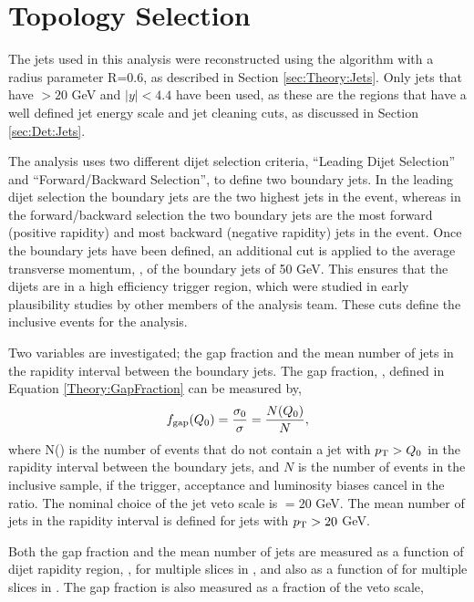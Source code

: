 \section{Topology Selection}
\label{sec:GBJ1:AnalSel}

The jets used in this analysis were reconstructed using the \antikt{} algorithm with a radius parameter R=0.6, as described in Section \ref{sec:Theory:Jets}.
Only jets that have \pt{}$>20$ GeV and $|y|<4.4$ have been used, as these are the regions that have a well defined jet energy scale and jet cleaning cuts, as discussed in Section \ref{sec:Det:Jets}. 

The analysis uses two different dijet selection criteria, ``Leading \pt{} Dijet Selection'' and ``Forward/Backward Selection'', to define two boundary jets. 
In the leading dijet \pt{} selection the boundary jets are the two highest \pt{} jets in the event, whereas in the forward/backward selection the two boundary jets are the most forward (positive rapidity) and most backward (negative rapidity) jets in the event. 
Once the boundary jets have been defined, an additional cut is applied to the average transverse momentum, \ptb{}, of the boundary jets of 50 GeV. 
This ensures that the dijets are in a high efficiency trigger region, which were studied in early plausibility studies \cite{ref:GBJConf1} by other members of the analysis team. 
These cuts define the inclusive events for the analysis. 


Two variables are investigated; the gap fraction and the mean  number of jets in the rapidity interval between the boundary jets. 
The gap fraction, \gap, defined in Equation \ref{Theory:GapFraction} can be measured by,
\begin{equation}
f_{\rm gap}(\mbox{$Q_0$}{}) = \frac{\sigma_{0}}{\sigma} =  \frac{N (\mbox{$Q_0$}{})}{N},
\label{GBJ1:fgap}
\end{equation}
where N(\qz{}) is the number of events that do not contain a jet with $\mbox{$p_{\rm T}$}{}>\mbox{$Q_0$}{}$ in the rapidity interval between the boundary jets, and $N$ is the number of events in the inclusive sample, if the trigger, acceptance and luminosity biases cancel in the ratio.
The nominal choice of the jet veto scale is \qz{}$=20$ GeV. 
The mean number of jets in the rapidity interval is defined for jets with $\mbox{$p_{\rm T}$}{}>20$ GeV. 

Both the gap fraction and the mean number of jets are measured as a function of dijet rapidity region, \dy{}, for multiple slices in \ptb{}, and also as a function of \ptb{} for multiple slices in \dy{}. 
The gap fraction is also measured as a fraction of the veto scale, \qz{}
